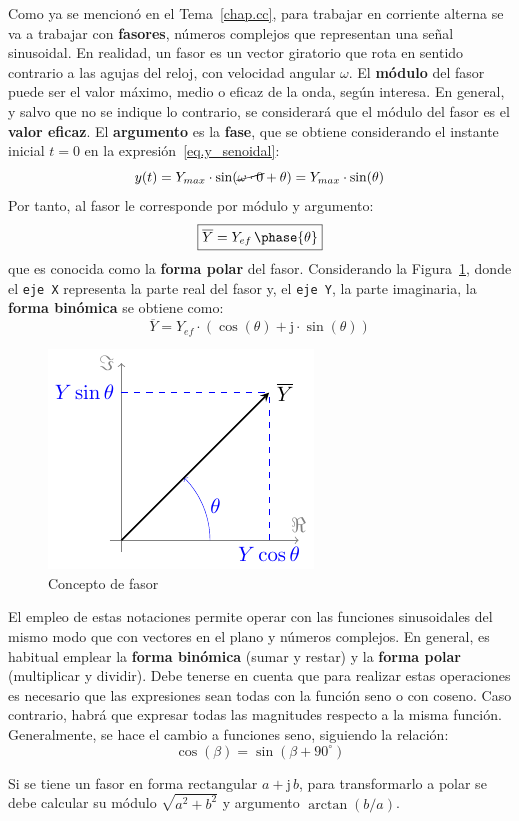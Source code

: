 \documentclass[11pt]{book} %
\numberwithin{dummy}{section}
\theoremstyle{ocrenumbox}
\theoremstyle{blacknumex}
\theoremstyle{blacknumbox}
\theoremstyle{ocrenum}
\newenvironment{remark}{\par\vspace{10pt}\small %
\begin{list}{}{
\leftmargin=35pt %
\rightmargin=25pt}\item\ignorespaces %
\makebox[-2.5pt]{\begin{tikzpicture}[overlay]
\node[draw=ocre!60,line width=1pt,circle,fill=ocre!25,font=\sffamily\bfseries,inner sep=2pt,outer sep=0pt] at (-15pt,0pt){\textcolor{ocre}{N}};\end{tikzpicture}} %
\advance\baselineskip -1pt}{\end{list}\vskip5pt} %
\newlength\esp
\begin{document}
	Como ya se mencionó en el Tema~\ref{chap.cc}, para trabajar en corriente alterna se va a trabajar con \textbf{fasores}, números complejos que representan una señal sinusoidal. En realidad, un fasor es un vector giratorio que rota en sentido contrario a las agujas del reloj, con velocidad angular $\omega$. El \textbf{módulo} del fasor puede ser el valor máximo, medio o eficaz de la onda, según interesa. En general, y salvo que no se indique lo contrario, se considerará que el módulo del fasor es el \textbf{valor eficaz}. El \textbf{argumento} es la \textbf{fase}, que se obtiene considerando el instante inicial $t=0$ en la expresión~\eqref{eq.y_senoidal}:
	\begin{equation*}
		y(t)=Y_{max}\cdot\sin(\cancel{\omega \cdot 0}+\theta)=Y_{max}\cdot\sin(\theta)
	\end{equation*}
	Por tanto, al fasor le corresponde por módulo y argumento:
	\begin{equation}
		\boxed{\overline{Y}=Y_{ef}\,\phase{\theta}}
	\end{equation}
	que es conocida como la \textbf{forma polar} del fasor. Considerando la Figura~\ref{fig.fasor}, donde el \texttt{eje X} representa la parte real del fasor y, el \texttt{eje Y}, la parte imaginaria, la \textbf{forma binómica} se obtiene como: 
	\begin{equation}
		\boxed{\overline{Y} = Y_{ef}\cdot(\cos(\theta)+\mathrm{j}\cdot\sin(\theta))}
	\end{equation}
	\begin{figure}[htbp]
		\centering
		\includegraphics{../figs/fasor.pdf}
		\caption{Concepto de fasor}
		\label{fig.fasor}
	\end{figure}
	
	El empleo de estas notaciones permite operar con las funciones sinusoidales del mismo modo que con vectores en el plano y números complejos. En general, es habitual emplear la \textbf{forma binómica} (sumar y restar) y la \textbf{forma polar} (multiplicar y dividir). Debe tenerse en cuenta que para realizar estas operaciones es necesario que las expresiones sean todas con la función seno o con coseno. Caso contrario, habrá que expresar todas las magnitudes respecto a la misma función. Generalmente, se hace el cambio a funciones seno, siguiendo la relación: 
	\begin{equation*}
		\cos(\beta)=\sin(\beta+90^\circ)
	\end{equation*}
	\begin{remark}
		Si se tiene un fasor en forma rectangular $a+\mathrm{j}\,b$, para transformarlo a polar se debe calcular su módulo $\sqrt{a^2+b^2}$ y argumento $\arctan(b/a)$.
	\end{remark}
	
\end{document}
